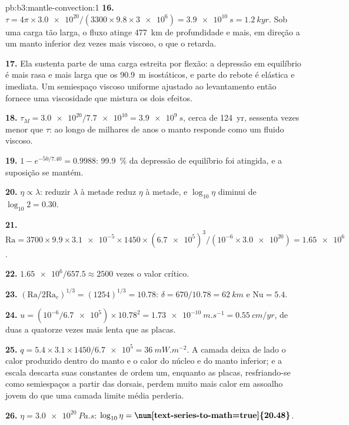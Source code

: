 \begin{solution}{pb:b3:mantle-convection:1}
\textbf{16.} $\tau = 4\pi\times\num{3.0e20}/(3300\times9.8\times\num{3e6}) =
\qty{3.9e10}{s} = \qty{1.2}{kyr}$. Sob uma carga tão larga, o fluxo atinge
\qty{477}{km} de profundidade e mais, em direção a um manto inferior dez vezes
mais viscoso, o que o retarda.

\textbf{17.} Ela sustenta parte de uma carga estreita por flexão: a depressão
em equilíbrio é mais rasa e mais larga que os \qty{90.9}{m} isostáticos, e
parte do rebote é elástica e imediata. Um semiespaço viscoso uniforme ajustado
ao levantamento então fornece uma viscosidade que mistura os dois efeitos.

\textbf{18.} $\tau_M = \num{3.0e20}/\num{7.7e10} = \qty{3.9e9}{s}$, cerca de
\qty{124}{yr}, sessenta vezes menor que $\tau$: ao longo de milhares de anos o
manto responde como um fluido viscoso.

\textbf{19.} $1 - e^{-50/7.40} = 0.9988$: \qty{99.9}{\percent} da depressão de
equilíbrio foi atingida, e a suposição se mantém.

\textbf{20.} $\eta \propto \lambda$: reduzir $\lambda$ à metade reduz $\eta$ à
metade, e $\log_{10}\eta$ diminui de $\log_{10}2 = 0.30$.

\textbf{21.} $\mathrm{Ra} = 3700\times9.9\times\num{3.1e-5}\times1450\times
(\num{6.7e5})^3/(10^{-6}\times\num{3.0e20}) = \num{1.65e6}$.

\textbf{22.} $\num{1.65e6}/657.5 \approx 2500$ vezes o valor crítico.

\textbf{23.} $(\mathrm{Ra}/2\mathrm{Ra}_c)^{1/3} = (1254)^{1/3} = 10.78$: $\delta
= 670/10.78 = \qty{62}{km}$ e $\mathrm{Nu} = 5.4$.

\textbf{24.} $u = (10^{-6}/\num{6.7e5})\times10.78^2 = \qty{1.73e-10}{m.s^{-1}}
= \qty{0.55}{cm/yr}$, de duas a quatorze vezes mais lenta que as placas.

\textbf{25.} $q = 5.4\times3.1\times1450/\num{6.7e5} = \qty{36}{mW.m^{-2}}$. A
camada deixa de lado o calor produzido dentro do manto e o calor do núcleo e do
manto inferior; e a escala descarta suas constantes de ordem um, enquanto as
placas, resfriando-se como semiespaços a partir das dorsais, perdem muito mais
calor em assoalho jovem do que uma camada limite média perderia.

\textbf{26.} $\eta = \qty{3.0e20}{Pa.s}$: $\log_{10}\eta =
\textbf{\num[text-series-to-math=true]{20.48}}$.
\end{solution}
